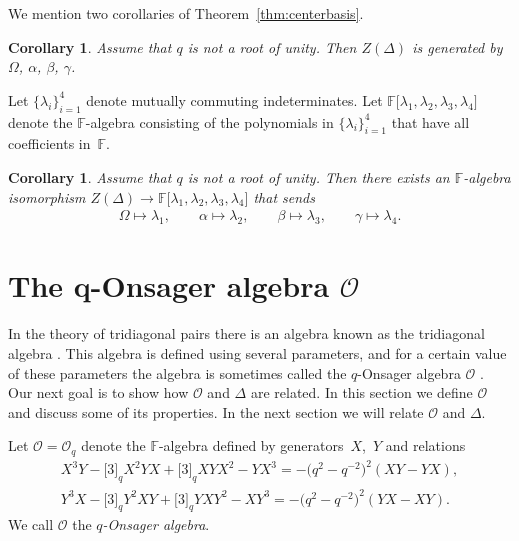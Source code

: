 \documentclass[pdftex]{sigma}
\numberwithin{equation}{section}
\newtheorem{Corollary}[Theorem]{Corollary}
\begin{document}
 We mention two corollaries of Theorem~\ref{thm:centerbasis}.


\begin{Corollary}
Assume that $q$ is not a root of unity. Then
$Z(\Delta)$ is generated by $\Omega$, $\alpha$, $\beta$, $\gamma$.
\end{Corollary}

  Let $\lbrace \lambda_i\rbrace_{i=1}^4$ denote mutually
commuting indeterminates. Let
$\mathbb F\lbrack \lambda_1,\lambda_2,\lambda_3,\lambda_4\rbrack$
denote the $\mathbb F$-algebra consisting of the polynomials
in
$\lbrace \lambda_i\rbrace_{i=1}^4$
that have all coef\/f\/icients in~$\mathbb F$.


\begin{Corollary}
Assume that $q$ is not a root of unity. Then
there exists an $\mathbb F$-algebra isomorphism
$Z(\Delta)\to
\mathbb F\lbrack \lambda_1,\lambda_2,\lambda_3,\lambda_4\rbrack$
that sends
\begin{gather*}
\Omega \mapsto \lambda_1,
\qquad
\alpha \mapsto \lambda_2,
\qquad
\beta \mapsto \lambda_3,
\qquad
\gamma \mapsto \lambda_4.
\end{gather*}
\end{Corollary}



\section[The $q$-Onsager algebra $\mathcal O$]{The $\boldsymbol{q}$-Onsager algebra $\boldsymbol{\mathcal O}$}


 In the theory of tridiagonal pairs
there is an algebra known as the tridiagonal algebra
\cite[Def\/inition~3.9]{qSerre}. This algebra
is def\/ined using several parameters, and for
a certain value of these parameters
the algebra
is sometimes called the $q$-Onsager algebra
 $\mathcal O$
\cite[Section~4]{basnc}.
Our next goal is to show how
 $\mathcal O$ and
 $\Delta$ are related.
In this section we def\/ine
 $\mathcal O$ and discuss some of its properties.
In the next section
we will relate
 $\mathcal O$ and $\Delta$.

\begin{Definition}
\label{def:qons}
Let ${\mathcal O}={\mathcal O}_q$ denote the
 $\mathbb F$-algebra
 def\/ined by genera\-tors~$X$,~$Y$ and relations
 \begin{gather}
X^3Y-\lbrack 3\rbrack_q X^2YX+\lbrack 3\rbrack_q XYX^2-YX^3
= -\big(q^2-q^{-2}\big)^2(XY-YX),
\label{eq:td1}
\\
Y^3X-\lbrack 3\rbrack_q Y^2XY+\lbrack 3\rbrack_q YXY^2-XY^3
= -\big(q^2-q^{-2}\big)^2(YX-XY).
\label{eq:td2}
 \end{gather}
We call $\mathcal O$ the {\it $q$-Onsager algebra}.
\end{Definition}
\end{document}
